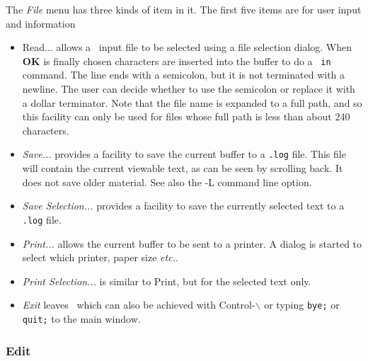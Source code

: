 The {\em File} menu has three kinds of item in it.  The first five
items are for user input and information
\begin{itemize}
\item{Read...} allows a \REDUCE\  input file to be selected using a
file selection dialog.  When {\bf OK} is finally chosen characters are
inserted into the buffer to do a \REDUCE\  {\tt in} command.  The line
ends with a semicolon, but it is not terminated with a newline.  The
user can decide whether to use the semicolon or replace it with a
dollar terminator.  Note that the file name is expanded to a full
path, and so this facility can only be used for files whose full path
is less than about 240 characters.

\item{\em Save...} provides a facility to save the current buffer to a
{\tt .log} file.  This file will contain the current viewable text, as can be
seen by scrolling back.  It does not save older material.  See also
the -L command line option.

\item{\em Save Selection...} provides a facility to save the currently
  selected text to a {\tt .log} file.  

\item{\em Print...} allows the current buffer to be sent to a printer.  A
  dialog is started to select which printer, paper size {\em etc.}.

\item{\em Print Selection...} is similar to Print, but for the selected text
  only.

\item{\em Exit} leaves \REDUCE\ which can also be achieved with
  Control-$\backslash$ or typing {\tt bye;} or {\tt quit;} to the
  main window.

\end{itemize}



\subsubsection{Edit}

